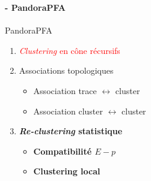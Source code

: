 \documentclass[8pt]{beamer}
\begin{document}
  \begin{frame}
  \frametitle{\secname}
  \framesubtitle{\subsecname - PandoraPFA}
  \footnotesize
    \begin{minipage}{0.6\linewidth}
    \begin{block}{PandoraPFA}
      \begin{enumerate}
        \item \textcolor{red}{\textit{Clustering} en cône récursifs}
        \item \textcolor{MyGreen}{Associations topologiques}
        \begin{itemize}
          \item \textcolor{MyGreen}{\footnotesize Association trace $\leftrightarrow$ cluster}
          \item \textcolor{MyGreen}{\footnotesize Association cluster $\leftrightarrow$ cluster}
        \end{itemize}
        \item  \textbf{\textit{Re-clustering} statistique}
        \begin{itemize}
          \item \textbf{\footnotesize Compatibilité $E-p$}
          \item \textbf{\footnotesize Clustering local}
        \end{itemize}
      \end{enumerate}
    \end{block}
    ~
    ~ \\
    \end{minipage} \hfill
    \begin{minipage}{0.39\linewidth}
      \begin{center}
\end{center}
\end{minipage}
\end{frame}
\end{document}
